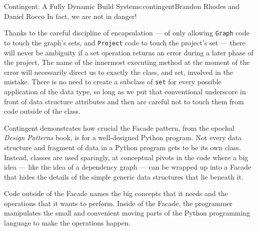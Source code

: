 \begin{aosachapter}{Contingent: A Fully Dynamic Build System}{s:contingent}{Brandon Rhodes and Daniel Rocco}
In fact, we are not in danger!

Thanks to the careful discipline of encapsulation --- of only allowing
\texttt{Graph} code to touch the graph's sets, and \texttt{Project} code
to touch the project's set --- there will never be ambiguity if a set
operation returns an error during a later phase of the project. The name
of the innermost executing method at the moment of the error will
necessarily direct us to exactly the class, and set, involved in the
mistake. There is no need to create a subclass of \texttt{set} for every
possible application of the data type, so long as we put that
conventional underscore in front of data structure attributes and then
are careful not to touch them from code outside of the class.

Contingent demonstrates how crucial the Facade pattern, from the epochal
\emph{Design Patterns} book, is for a well-designed Python program. Not
every data structure and fragment of data in a Python program gets to be
its own class. Instead, classes are used sparingly, at conceptual pivots
in the code where a big idea --- like the idea of a dependency graph ---
can be wrapped up into a Facade that hides the details of the simple
generic data structures that lie beneath it.

Code outside of the Facade names the big concepts that it needs and the
operations that it wants to perform. Inside of the Facade, the
programmer manipulates the small and convenient moving parts of the
Python programming language to make the operations happen.

\end{aosachapter}

